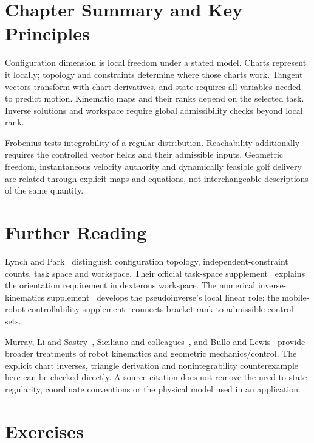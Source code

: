 \section{Chapter Summary and Key Principles}
\label{sec:summary}
\label{princ:principle_config}

Configuration dimension is local freedom under a stated model. Charts represent it locally; topology and constraints determine where those charts work. Tangent vectors transform with chart derivatives, and state requires all variables needed to predict motion. Kinematic maps and their ranks depend on the selected task. Inverse solutions and workspace require global admissibility checks beyond local rank.

Frobenius tests integrability of a regular distribution. Reachability additionally requires the controlled vector fields and their admissible inputs. Geometric freedom, instantaneous velocity authority and dynamically feasible golf delivery are related through explicit maps and equations, not interchangeable descriptions of the same quantity.

\section{Further Reading}
\label{sec:ch3_further_reading}

Lynch and Park~\cite{Lynch2017} distinguish configuration topology, independent-constraint counts, task space and workspace. Their official task-space supplement~\cite{MRWorkspaceSupplement} explains the orientation requirement in dexterous workspace. The numerical inverse-kinematics supplement~\cite{MRNumericalIKSupplement} develops the pseudoinverse's local linear role; the mobile-robot controllability supplement~\cite{MRControllabilitySupplement} connects bracket rank to admissible control sets.

Murray, Li and Sastry~\cite{Murray1994}, Siciliano and colleagues~\cite{siciliano2009}, and Bullo and Lewis~\cite{BulloLewis2004} provide broader treatments of robot kinematics and geometric mechanics/control. The explicit chart inverses, triangle derivation and nonintegrability counterexample here can be checked directly. A source citation does not remove the need to state regularity, coordinate conventions or the physical model used in an application.

\section{Exercises}
\label{sec:ch3_exercises}


